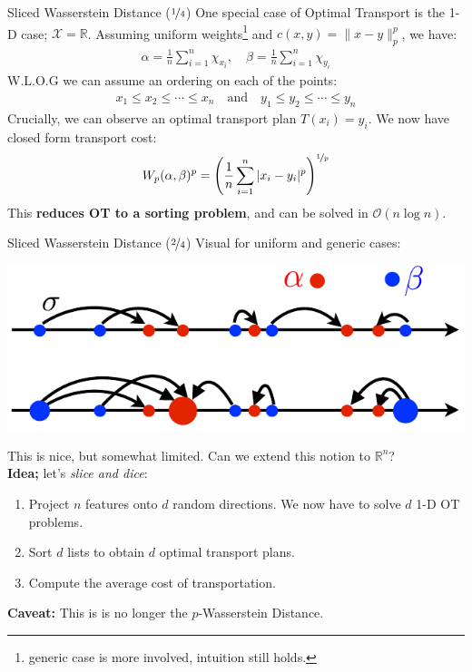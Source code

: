 \documentclass{beamer}
\begin{document}
\begin{frame}{Sliced Wasserstein Distance ($\nicefrac{1}{4}$)}
	One special case of Optimal Transport is the 1-D case; $\mathcal{X} = \mathbb{R}$. Assuming uniform weights\footnote{generic case is more involved, intuition still holds.} and $c(x, y) = \| x - y \|^p_p$, we have:
	\begin{gather}
		\alpha = \frac{1}{n} \sum^n_{i=1} \chi_{x_i}, \quad \beta = \frac{1}{n} \sum^n_{i=1} \chi_{y_i}
	\end{gather} \pause
	W.L.O.G we can assume an ordering on each of the points:
	\begin{gather}
		x_1 \leq x_2 \leq \cdots \leq x_n \quad \text{and} \quad y_1 \leq y_2 \leq \cdots \leq y_n
	\end{gather} \pause
	Crucially, we can observe an optimal transport plan $T(x_i) = y_i$. \pause We now have closed form transport cost:
	\vspace{-1em}
	\begin{gather}
		W_p (\alpha, \beta)^p = \left(\frac{1}{n} \sum^n_{i=1} |x_i - y_i|^p\right)^{\nicefrac{1}{p}}
	\end{gather} \pause
	\vspace{1em}
	This \textbf{reduces OT to a sorting problem}, and can be solved in $\mathcal{O}(n \log n)$.
\end{frame}

\begin{frame}{Sliced Wasserstein Distance ($\nicefrac{2}{4}$)}
	Visual for uniform and generic cases:
	\vspace{-1em}
	\begin{center}
		\includegraphics[width=.65\textwidth]{img/1d-schematic}
	\end{center} \pause
	\vspace{-1em}

	This is nice, but somewhat limited. Can we extend this notion to $\mathbb{R}^n$? \pause \newline \\

	\textbf{Idea;} let's \textit{slice and dice}:
	\begin{enumerate}[label=\arabic*.]
		\item Project $n$ features onto $d$ random directions. \pause We now have to solve $d$ 1-D OT problems. \pause
		\item Sort $d$ lists to obtain $d$ optimal transport plans. \pause
		\item Compute the average cost of transportation. \pause
	\end{enumerate}
	
	\textbf{Caveat:} This is is no longer the $p$-Wasserstein Distance.
\end{frame}
\end{document}
